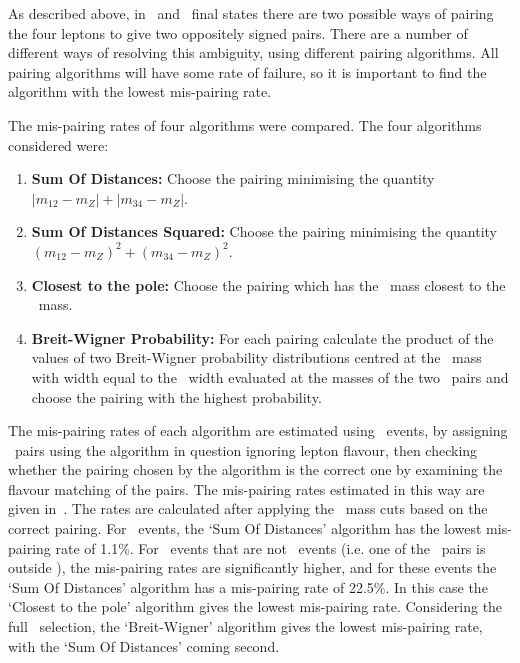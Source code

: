 As described above, in \eeee\ and \mmmm\ final states there are two possible
ways of pairing the four leptons to give two oppositely signed pairs. There are
a number of different ways of resolving this ambiguity, using different pairing
algorithms. All pairing algorithms will have some rate of failure, so it is
important to find the algorithm with the lowest mis-pairing rate.

The mis-pairing rates of four algorithms were compared. The four algorithms
considered were:

\begin{enumerate}
    \item {\bf Sum Of Distances:} Choose the pairing minimising the quantity
    ${|m_{12}-m_{Z}|+|m_{34}-m_{Z}|}$.
    \item {\bf Sum Of Distances Squared:} Choose the pairing minimising the quantity
    $(m_{12}-m_{Z})^{2}+(m_{34}-m_{Z})^{2}$.
    \item {\bf Closest to the pole:} Choose the pairing which has the 
    \dilep\ mass closest to the \Z\ mass.
    \item {\bf Breit-Wigner Probability:} For each pairing calculate the product
    of the values of two Breit-Wigner probability distributions centred at the \Z\ mass with
    width equal to the \Z\ width evaluated at the masses of the two \dilep\
    pairs and choose the pairing with the highest probability.
\end{enumerate}

The mis-pairing rates of each algorithm are estimated using \ZZeemm\ events, by
assigning \dilep\ pairs using the algorithm in question ignoring
lepton flavour, then checking whether the
pairing chosen by the algorithm is the correct one by examining the flavour
matching of the pairs.
The mis-pairing rates estimated in this way are given in~. The
rates are calculated after applying the \Z\ mass cuts based on the correct
pairing. For
\ZZ\ events, the `Sum Of Distances' algorithm has the lowest mis-pairing rate of
1.1\%.
For \ZZs\ events that are not \ZZ\ events (i.e. one of the \dilep\ pairs is
outside \sstooos), the mis-pairing rates are significantly higher, and for these
events the  `Sum Of Distances' algorithm has a mis-pairing rate of 22.5\%. In
this case the `Closest to the pole' algorithm gives the lowest mis-pairing rate.
Considering the full \ZZs\ selection, the `Breit-Wigner' algorithm gives the
lowest mis-pairing rate, with the `Sum Of Distances' coming second.

